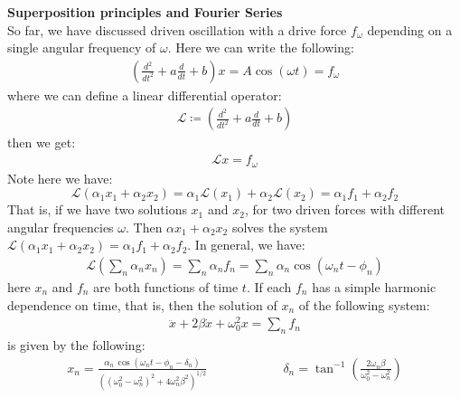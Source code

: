\documentclass[11pt,oneside]{book}
\theoremstyle{break}
\theoremstyle{break}
\begin{document}
\newpage
\textbf{Superposition principles and Fourier Series}\\
So far, we have discussed driven oscillation with a drive force $f_{\omega}$ depending on a single angular frequency of $\omega$. Here we can write the following:
\begin{align*}
\left( \frac{d^2}{dt^2}+ a\frac{d}{dt}+b\right) x = A\cos(\omega t) = f_{\omega}
\end{align*}	
where we can define a linear differential operator:
\begin{align*}
\mathcal{L} \coloneqq \left( \frac{d^2}{dt^2}+ a\frac{d}{dt}+b\right)
\end{align*}
then we get:
\begin{align*}
 \mathcal{L}x = f_{\omega}
\end{align*}
Note here we have: 
$$\mathcal{L}(\alpha_1 x_1+\alpha_2 x_2) = \alpha_1\mathcal{L}(x_1) + \alpha_2\mathcal{L}(x_2)= \alpha_1 f_1 + \alpha_2 f_2$$
That is, if we have two solutions $x_1$ and $x_2$, for two driven forces with different angular frequencies $\omega$. Then $\alpha x_1 + \alpha_2 x_2$ solves the system $\mathcal{L}(\alpha_1 x_1+\alpha_2 x_2) = \alpha_1 f_1 + \alpha_2 f_2$. In general, we have:
\begin{align*}
\mathcal{L}\left( \sum_n \alpha_n x_n \right) = \sum_n \alpha_n f_n  = \sum_n \alpha_n \cos(\omega_n t - \phi_n)
\end{align*}
here $x_n$ and $f_n$ are both functions of time $t$. If each $f_n$ has a simple harmonic dependence on time, that is, then the solution of $x_n$ of the following system:
\begin{align*}
\ddot{x}+2\beta\dot{x}+\omega_0^2 x = \sum_{n} f_n
\end{align*}
is given by the following:
\begin{align*}
x_n = \frac{\alpha_n \,  \cos(\omega_n t - \phi_n - \delta_n)}{\left((\omega_0^2 - \omega_n^2 ) ^2 + 4\omega_n^2 \beta^2 \right)^{1/2}}\qquad\qquad\qquad \delta_n = \tan^{-1}\left(\frac{2\omega_n \beta}{\omega_0^2 - \omega_n^2} \right)
\end{align*}



\newpage
\end{document}
